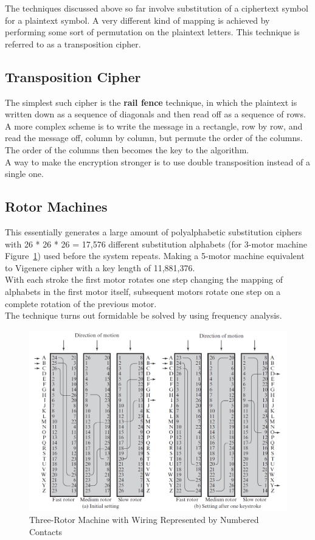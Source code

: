 \documentclass{article}
\begin{document}
The techniques discussed above so far involve substitution of a ciphertext symbol for a plaintext symbol. A very different kind of mapping is achieved by performing some sort of permutation on the plaintext letters. This technique is referred to as a
transposition cipher.

\subsection{Transposition Cipher}
The simplest such cipher is the {\bf rail fence} technique, in which the plaintext is written down as a sequence of diagonals and then read off as a sequence of rows. A more complex scheme is to write the message in a rectangle, row by row, and read the message off, column by column, but permute the order of the columns. The order of the columns then becomes the key to the algorithm.\\
A way to make the encryption stronger is to use double transposition instead of a single one.

\subsection{Rotor Machines}
This essentially generates a large amount of polyalphabetic substitution ciphers with 26 * 26 * 26 = 17,576 different substitution alphabets (for 3-motor machine Figure~\ref{fig:rotors}) used before the system repeats. Making a 5-motor machine equivalent to Vigenere cipher with a key length of 11,881,376.\\
With each stroke the first motor rotates one step changing the mapping of alphabets in the first motor itself, subsequent motors rotate one step on a complete rotation of the previous motor.\\
The technique turns out formidable be solved by using frequency analysis. 
\begin{figure}[h]
    \centering
    \includegraphics[width=\textwidth]{rotors.png}
    \caption{Three-Rotor Machine with Wiring Represented by Numbered Contacts \cite{rotors}}
    \label{fig:rotors}
\end{figure}
\end{document}
